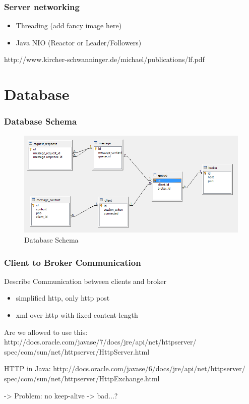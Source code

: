 \documentclass{beamer}
\begin{document}
\begin{frame}
\frametitle{Server networking}
\begin{itemize}
\item Threading (add fancy image here)
\item Java NIO (Reactor or Leader/Followers)
\end{itemize}
http://www.kircher-schwanninger.de/michael/publications/lf.pdf
\end{frame}



\section{Database}
\begin{frame}
\frametitle{Database Schema}

\begin{figure}
  \begin{center}
    \includegraphics[scale=0.4]{../../database/db-schema.png}
  \end{center}
  \caption{Database Schema}
  \label{fig:db-schema}
\end{figure}
\end{frame}






\begin{frame}
\frametitle{Client to Broker Communication}

Describe Communication between clients and broker
\begin{itemize}
\item simplified http, only http post
\item xml over http with fixed content-length
\end{itemize}

Are we allowed to use this:
http://docs.oracle.com/javase/7/docs/jre/api/net/httpserver/
spec/com/sun/net/httpserver/HttpServer.html

HTTP in Java:
http://docs.oracle.com/javase/6/docs/jre/api/net/httpserver/
spec/com/sun/net/httpserver/HttpExchange.html

-> Problem: no keep-alive -> bad...?
\end{frame}
\end{document}
